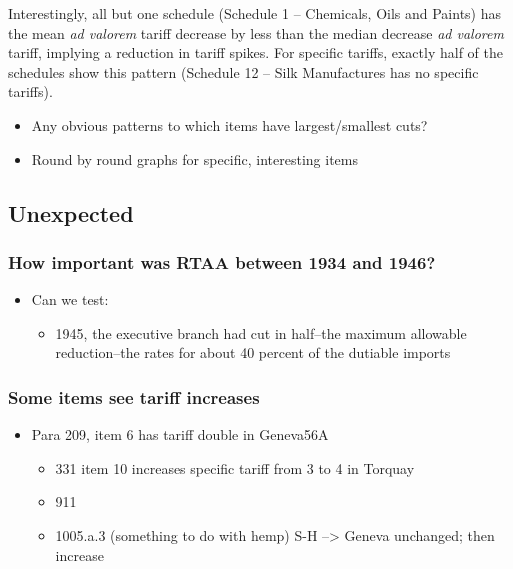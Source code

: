 \documentclass[
  12pt,
]{article}
\providecommand{\tightlist}{%
  \setlength{\itemsep}{0pt}\setlength{\parskip}{0pt}}
\begin{document}
Interestingly, all but one schedule (Schedule 1 -- Chemicals, Oils and Paints) has the mean \emph{ad valorem} tariff decrease by less than the median decrease \emph{ad valorem} tariff, implying a reduction in tariff spikes. For specific tariffs, exactly half of the schedules show this pattern (Schedule 12 -- Silk Manufactures has no specific tariffs).

\begin{itemize}
\item
  Any obvious patterns to which items have largest/smallest cuts?
\item
  Round by round graphs for specific, interesting items
\end{itemize}

\hypertarget{unexpected}{%
\subsection{Unexpected}\label{unexpected}}

\hypertarget{how-important-was-rtaa-between-1934-and-1946}{%
\subsubsection{How important was RTAA between 1934 and 1946?}\label{how-important-was-rtaa-between-1934-and-1946}}

\begin{itemize}
\item
  Can we test:

  \begin{itemize}
  \tightlist
  \item
    1945, the executive branch had cut in half--the maximum allowable reduction--the rates for about 40 percent of the dutiable imports
  \end{itemize}
\end{itemize}

\hypertarget{some-items-see-tariff-increases}{%
\subsubsection{Some items see tariff increases}\label{some-items-see-tariff-increases}}

\begin{itemize}
\item
  Para 209, item 6 has tariff double in Geneva56A

  \begin{itemize}
  \tightlist
  \item
    331 item 10 increases specific tariff from 3 to 4 in Torquay
  \item
    911
  \item
    1005.a.3 (something to do with hemp) S-H --\textgreater{} Geneva unchanged; then increase
  \end{itemize}
\end{itemize}
\end{document}
